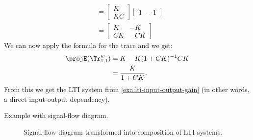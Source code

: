 {\begin{example}
\begin{equation*}
\begin{aligned}
                        & =\begin{bmatrix}K \\ {KC}\end{bmatrix}\begin{bmatrix} 1 & -1 \end{bmatrix} \\
                        & =\begin{bmatrix}
                               K  & -K  \\
                               CK & -CK
                           \end{bmatrix}
            \end{aligned}
        \end{equation*}
        We can now apply the formula for the trace and we get:
        \begin{equation*}
            \begin{aligned}
                \projE(\Tr_{1,1}^{w}) & =K - K(1+CK)^{-1}CK \\
                                      & =\frac{K}{1+CK}.
            \end{aligned}
        \end{equation*}
        From this we get the LTI system from \cref{exa:lti-input-output-gain} (in other words, a direct input-output dependency).

        \begin{marginfigure}
            \begin{center}
            \end{center}
            \caption{Example with signal-flow diagram.}
            \label{fig:lti-ex-signalflow}
        \end{marginfigure}
    \end{example}

    \begin{figure}
        \centering
        \caption{Signal-flow diagram transformed into composition of LTI systems.}
        \label{fig:lti-ex-signalflow-bis}
    \end{figure}}